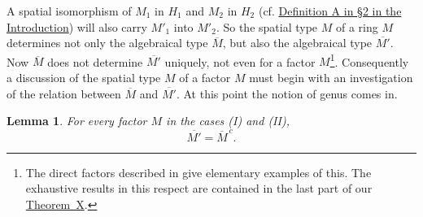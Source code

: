\documentclass[b5paper,twoside]{article}
\newcommand{\thmref}[2]{\hyperref[#1]{\mbox{Theorem~#2}}}
\theoremstyle{mvnplain}
\newtheorem{lemma}{Lemma}[section]
\newcommand{\M}{\mathbf M}
\newcommand{\Hilbert}{\mathfrak H}
\def\M{M}%
\def\Hilbert{H}%
\def\widetilde#1{#1}%
\def\mathfrak#1{#1}%
\begin{document}
A spatial isomorphism of \(\M_1\) in \(\Hilbert_1\) and \(\M_2\) in
\(\Hilbert_2\) (cf.
\hyperref[intro:2]{Definition A in \S2 in the Introduction}) will also carry
\(\M'_1\) into \(\M'_2\). So the spatial type \(\widetilde{\M}\) of a ring
\(\M\) determines not only the algebraical type \(\overline{\M}\), but also
the algebraical type \(\overline{\M'}\). Now \(\overline{\M}\) does not
determine \(\overline{\M'}\) uniquely, not even for a factor
\(\M\)\footnote{The direct factors described in \cite[p.~139, or p.~173,
Lemma~8.6.1]{ref5} give elementary examples of this. The exhaustive results
in this respect are contained in the last part of our \thmref{thm:X}{X}.}.
Consequently a discussion of the spatial type \(\widetilde{\M}\) of a factor
\(\M\) must begin with an investigation of the relation between
\(\overline{\M}\) and \(\overline{\M'}\). At this point the notion of genus
comes in.

\begin{lemma}\label{lem:3.3.1}
For every factor \(\M\) in the cases (I) and (II),
\[
  \overline{\M'}=\overline{\M}^{\,c}.
\]
\end{lemma}
\end{document}
